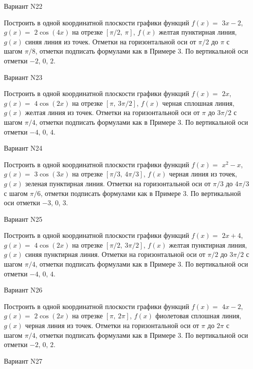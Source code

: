 \documentclass[11pt]{report}
\begin{document}
Вариант N22

Построить в одной координатной плоскости графики функций $f(x) = $
    $3 x - 2$, $g(x) = $
    $2 \cos{\left(4 x \right)}$ на 
    отрезке $\left[ \pi / 2, \  \pi\right]$, $f(x)$ желтая 
    пунктирная линия, $g(x)$ синяя линия из точек. 
    Отметки на горизонтальной оси от $\pi / 2$ до $\pi$ с 
    шагом $\pi / 8$, отметки подписать формулами как в Примере 3.  
    По вертикальной оси отметки $-2$, 0, $2$.

Вариант N23

Построить в одной координатной плоскости графики функций $f(x) = $
    $2 x$, $g(x) = $
    $4 \cos{\left(2 x \right)}$ на 
    отрезке $\left[ \pi, \  3 \pi / 2\right]$, $f(x)$ черная 
    сплошная линия, $g(x)$ желтая линия из точек. 
    Отметки на горизонтальной оси от $\pi$ до $3 \pi / 2$ с 
    шагом $\pi / 4$, отметки подписать формулами как в Примере 3.  
    По вертикальной оси отметки $-4$, 0, $4$.

Вариант N24

Построить в одной координатной плоскости графики функций $f(x) = $
    $x^{2} - x$, $g(x) = $
    $3 \cos{\left(3 x \right)}$ на 
    отрезке $\left[ \pi / 3, \  4 \pi / 3\right]$, $f(x)$ черная 
    линия из точек, $g(x)$ зеленая пунктирная линия. 
    Отметки на горизонтальной оси от $\pi / 3$ до $4 \pi / 3$ с 
    шагом $\pi / 6$, отметки подписать формулами как в Примере 3.  
    По вертикальной оси отметки $-3$, 0, $3$.

Вариант N25

Построить в одной координатной плоскости графики функций $f(x) = $
    $2 x + 4$, $g(x) = $
    $4 \cos{\left(2 x \right)}$ на 
    отрезке $\left[ \pi / 2, \  3 \pi / 2\right]$, $f(x)$ желтая 
    пунктирная линия, $g(x)$ синяя пунктирная линия. 
    Отметки на горизонтальной оси от $\pi / 2$ до $3 \pi / 2$ с 
    шагом $\pi / 4$, отметки подписать формулами как в Примере 3.  
    По вертикальной оси отметки $-4$, 0, $4$.

Вариант N26

Построить в одной координатной плоскости графики функций $f(x) = $
    $4 x - 2$, $g(x) = $
    $2 \cos{\left(2 x \right)}$ на 
    отрезке $\left[ \pi, \  2 \pi\right]$, $f(x)$ фиолетовая 
    сплошная линия, $g(x)$ черная линия из точек. 
    Отметки на горизонтальной оси от $\pi$ до $2 \pi$ с 
    шагом $\pi / 4$, отметки подписать формулами как в Примере 3.  
    По вертикальной оси отметки $-2$, 0, $2$.

Вариант N27
\end{document}
